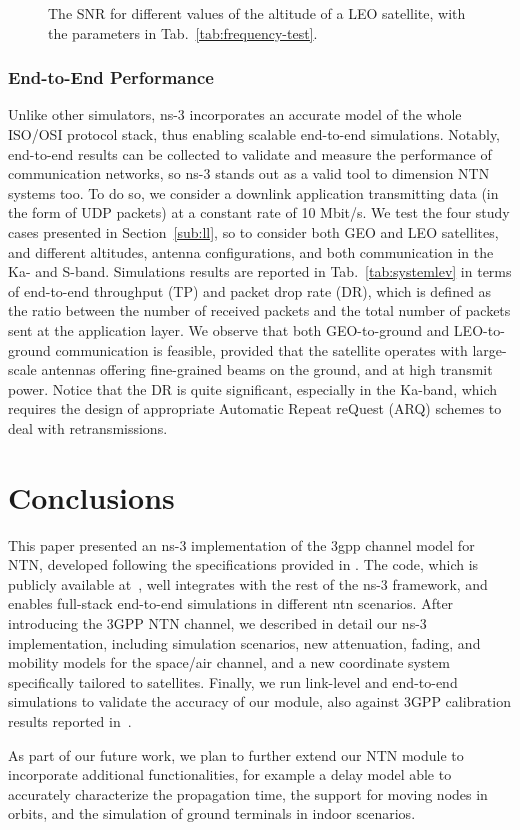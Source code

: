 \begin{figure}[t]
    \centering 
    \setlength{}
    \setlength{}
    
    \caption{The SNR for different values of the altitude of a LEO satellite, with the parameters in Tab.~\ref{tab:frequency-test}.}
    \label{fig:altitude-test}
\end{figure}

\subsubsection{End-to-End Performance}
Unlike other simulators, ns-3 incorporates an accurate model of the whole ISO/OSI protocol stack, thus enabling scalable end-to-end simulations. Notably, end-to-end results can be collected to validate and measure the performance of communication networks, so ns-3 stands out as a valid tool to dimension NTN systems too.
To do so, we consider a downlink application transmitting data (in the form of UDP packets) at a constant rate of 10 Mbit/s. We test the four study cases presented in Section~\ref{sub:ll}, so to consider both GEO and LEO satellites, and different altitudes, antenna configurations, and both communication in the Ka- and S-band. 
Simulations results are reported in Tab.~\ref{tab:systemlev} in terms of end-to-end throughput (TP) and packet drop rate (DR), which is defined as the ratio between the number of received packets and the total number of packets sent at the application layer.
We observe that both GEO-to-ground and LEO-to-ground communication is feasible, provided that the satellite operates with large-scale antennas offering fine-grained beams on the ground, and at high transmit power. 
Notice that the DR is quite significant, especially in the Ka-band, which requires the design of appropriate Automatic Repeat reQuest (ARQ) schemes to deal with retransmissions.


\section{Conclusions}
\label{sec:conclusions}
This paper presented an ns-3 implementation of the \gls{3gpp} channel model for NTN, developed following the specifications provided in \cite{38811}.
The code, which is publicly available at~\cite{ntngitlab}, well integrates with the rest of the ns-3 framework, and enables full-stack end-to-end simulations in different \gls{ntn} scenarios. After introducing the 3GPP NTN channel, we described in detail our ns-3 implementation, including simulation scenarios, new attenuation, fading, and mobility models for the space/air channel, and a new coordinate system specifically tailored to satellites. Finally, we run link-level and end-to-end simulations to validate the accuracy of our module, also against 3GPP calibration results reported in~\cite{38821}.

As part of our future work, we plan to further extend our NTN module to incorporate additional functionalities, for example a delay model able to accurately characterize the propagation time, the support for moving nodes in orbits, and the simulation of ground terminals in indoor scenarios.
